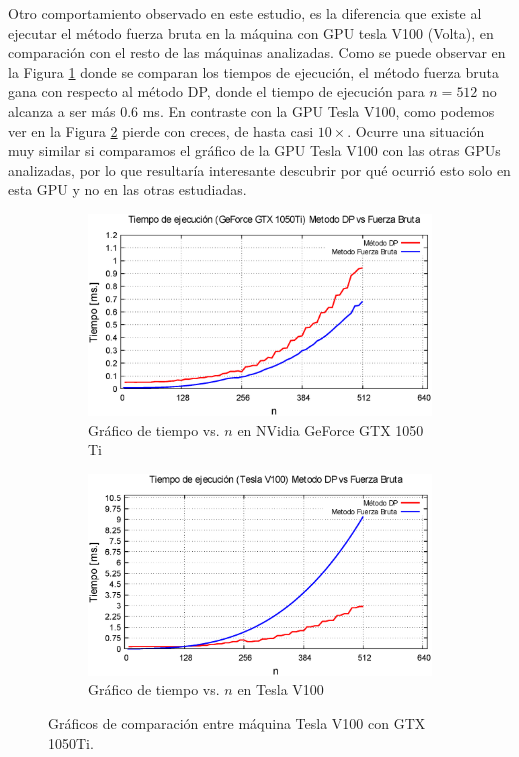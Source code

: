 \documentclass[10pt, conference, compsocconf, onecolumn]{IEEEtran}
\begin{document}
 Otro comportamiento observado en este estudio, es la diferencia que existe al ejecutar el m\'etodo fuerza bruta en la m\'aquina con GPU tesla V100 (Volta), en comparaci\'on con el resto de las m\'aquinas analizadas. Como se puede observar en la Figura \ref{fig_compa_volta} donde se comparan los tiempos de ejecuci\'on, el m\'etodo fuerza bruta gana con respecto al m\'etodo DP, donde el tiempo de ejecuci\'on para $n=512$ no alcanza a ser m\'as 0.6 ms. En contraste con la GPU Tesla V100, como podemos ver en la Figura \ref{fig_Carbon_compa} pierde con creces, de hasta casi $10\times$. Ocurre una situaci\'on muy similar si comparamos el gr\'afico de la GPU Tesla V100 con las otras GPUs analizadas, por lo que resultar\'ia interesante descubrir por qu\'e ocurri\'o esto solo en esta GPU y no en las otras estudiadas.



\begin{figure}[H]
	\centering
	\begin{subfigure}[b]{0.475\textwidth}
		\centering
		\includegraphics[width=\textwidth]{figures/carbon_compa.eps}
		\caption{Gr\'afico de tiempo vs. $n$ en NVidia GeForce GTX 1050 Ti}
		\label{fig_compa_volta}
	\end{subfigure}
	\hfill
	\begin{subfigure}[b]{0.475\textwidth}
		\centering 
		\includegraphics[width=\textwidth]{figures/Volta_comp.eps}
		\caption{Gr\'afico de tiempo vs. $n$ en Tesla V100}
		\label{fig_Carbon_compa}
	\end{subfigure}
 	\caption[ Gr\'aficos de comparaci\'on entre m\'aquina Tesla V100 con GTX 1050Ti. ]
{\small Gr\'aficos de comparaci\'on entre m\'aquina Tesla V100 con GTX 1050Ti.} 
\label{Graf_compa}
\end{figure}
\end{document}
